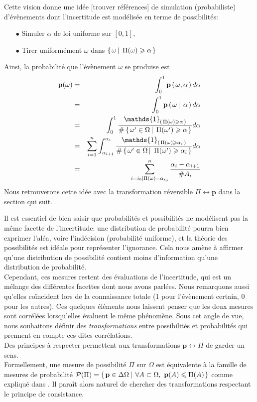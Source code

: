 {Cette vision donne une idée [trouver références] de simulation (probabiliste) d'évènements dont l'incertitude est modélisée en terme de possibilités:
\begin{itemize}
\item[$\bullet$] Simuler $\alpha$ de loi uniforme sur $[0,1]$,
\item[$\bullet$] Tirer uniformément $\omega$ dans $\left\{ \left. \omega \, \right| \left. \, \Pi(\omega) \geqslant \alpha \right. \right\}$
\end{itemize}
Ainsi, la probabilité que l'évènement $\omega$ se produise est
\begin{eqnarray}
\nonumber \mathbf{p}(\omega) & = & \int_0^1 \mathbf{p} \paren{ \omega,\alpha} d \alpha \\
\nonumber & =  & \int_0^1 \mathbf{p} \paren{ \omega \sachant\alpha} d \alpha \\
\nonumber & = & \int_0^1 \dfrac{\mathds{1}_{\paren{ \Pi(\omega) \geqslant \alpha}}}{ \# \set{ \omega' \in \Omega \sachant \Pi(\omega')\geqslant \alpha }} d \alpha \\
\nonumber & = & \sum_{i=1}^n \int_{\alpha_{i+1}}^{\alpha_i} \dfrac{\mathds{1}_{\paren{ \Pi(\omega) \geqslant \alpha_i}}}{ \# \set{ \omega' \in \Omega \sachant \Pi(\omega')\geqslant \alpha_i }} d \alpha \\
\label{transf_simu} & = & \sum_{i=i_0 \vert \Pi(\omega)=\alpha_{i_0} }^n  \dfrac{\alpha_i-\alpha_{i+1}}{ \# A_i }
\end{eqnarray}
Nous retrouverons cette idée avec la transformation réversible $\Pi \leftrightarrow \mathbf{p}$ dans la section qui suit.


Il est essentiel de bien saisir que probabilités et possibilités ne modélisent pas la même facette de l'incertitude: une distribution de probabilité pourra bien exprimer l'aléa, voire l'indécision (probabilité uniforme), et la théorie des possibilités est idéale pour représenter l'ignorance. Cela nous amène à affirmer qu'une distribution de possibilité contient moins d'information qu'une distribution de probabilité. \\

Cependant, ces mesures restent des évaluations de l'incertitude, qui est un mélange des différentes facettes dont nous avons parlées. Nous remarquons aussi qu'elles coïncident lors de la connaissance totale (1 pour l'évènement certain, 0 pour les autres). Ces quelques éléments nous laissent penser que les deux mesures sont corrélées lorsqu'elles évaluent le même phénomène. Sous cet angle de vue, nous souhaitons définir des \textit{transformations} entre possibilités et probabilités qui prennent en compte ces dites corrélations. \\
Des principes à respecter permettent aux transformations $\mathbf{p} \leftrightarrow \Pi$ de garder un sens.\\
Formellement, une mesure de possibilité  $\Pi$ sur $\Omega$ est équivalente à la famille de mesures de probabilité $\mathcal{P}(\Pi)=\left\{ \left. \mathbf{p} \in \Delta \Omega \, \right| \left. \, \forall A \subset \Omega, \ \mathbf{p}(A) \leqslant \Pi(A)  \right. \right\}$ comme expliqué dans \cite{DuPr1988.4}. Il paraît alors naturel de chercher des transformations respectant le principe de consistance.

}
